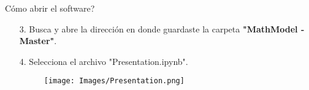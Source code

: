 \begin{frame}[t]{C\'omo abrir el software?}\vspace{-2pt}

\begin{enumerate}
	\item[3.] Busca y abre la direcci\'on en donde guardaste la carpeta \textbf{"MathModel - Master"}.
	\item[4.] Selecciona el archivo "Presentation.ipynb".
	\begin{figure}
		\texttt{[image: Images/Presentation.png]}
	\end{figure}
\end{enumerate}


\end{frame}